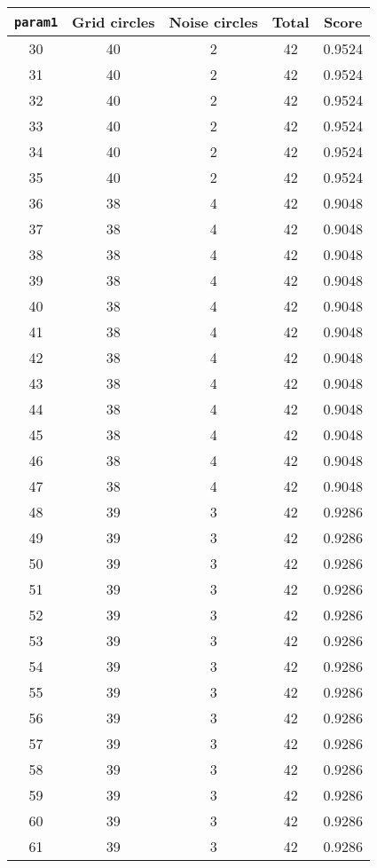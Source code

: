 \documentclass[letterpaper, 12pt]{article}
\begin{document}
\begin{longtable}{|c|c|c|c|c|}
\hline
\textbf{\texttt{param1}} & \textbf{Grid circles} & \textbf{Noise circles} & \textbf{Total} & \textbf{Score} \\
\hline
30 & 40 & 2 & 42 & 0.9524 \\
\hline
31 & 40 & 2 & 42 & 0.9524 \\
\hline
32 & 40 & 2 & 42 & 0.9524 \\
\hline
33 & 40 & 2 & 42 & 0.9524 \\
\hline
34 & 40 & 2 & 42 & 0.9524 \\
\hline
35 & 40 & 2 & 42 & 0.9524 \\
\hline
36 & 38 & 4 & 42 & 0.9048 \\
\hline
37 & 38 & 4 & 42 & 0.9048 \\
\hline
38 & 38 & 4 & 42 & 0.9048 \\
\hline
39 & 38 & 4 & 42 & 0.9048 \\
\hline
40 & 38 & 4 & 42 & 0.9048 \\
\hline
41 & 38 & 4 & 42 & 0.9048 \\
\hline
42 & 38 & 4 & 42 & 0.9048 \\
\hline
43 & 38 & 4 & 42 & 0.9048 \\
\hline
44 & 38 & 4 & 42 & 0.9048 \\
\hline
45 & 38 & 4 & 42 & 0.9048 \\
\hline
46 & 38 & 4 & 42 & 0.9048 \\
\hline
47 & 38 & 4 & 42 & 0.9048 \\
\hline
48 & 39 & 3 & 42 & 0.9286 \\
\hline
49 & 39 & 3 & 42 & 0.9286 \\
\hline
50 & 39 & 3 & 42 & 0.9286 \\
\hline
51 & 39 & 3 & 42 & 0.9286 \\
\hline
52 & 39 & 3 & 42 & 0.9286 \\
\hline
53 & 39 & 3 & 42 & 0.9286 \\
\hline
54 & 39 & 3 & 42 & 0.9286 \\
\hline
55 & 39 & 3 & 42 & 0.9286 \\
\hline
56 & 39 & 3 & 42 & 0.9286 \\
\hline
57 & 39 & 3 & 42 & 0.9286 \\
\hline
58 & 39 & 3 & 42 & 0.9286 \\
\hline
59 & 39 & 3 & 42 & 0.9286 \\
\hline
60 & 39 & 3 & 42 & 0.9286 \\
\hline
61 & 39 & 3 & 42 & 0.9286 \\

\end{longtable}
\end{document}
